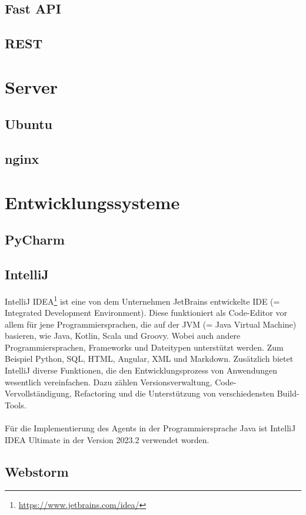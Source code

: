 \documentclass{report}
\begin{document}
\subsection{Fast API}
\subsection{REST}

\section{Server}
\subsection{Ubuntu}
\subsection{nginx}

\section{Entwicklungssysteme}
\subsection{PyCharm}
\subsection{IntelliJ }
IntelliJ IDEA\footnote{\url{https://www.jetbrains.com/idea/}} ist eine von dem Unternehmen JetBrains entwickelte IDE (= Integrated Development Environment). Diese funktioniert als Code-Editor vor allem für jene Programmiersprachen, die auf der JVM (= Java Virtual Machine) basieren, wie Java, Kotlin, Scala und Groovy. Wobei auch andere Programmiersprachen, Frameworks und Dateitypen unterstützt werden. Zum Beispiel Python, SQL, HTML, Angular, XML und Markdown. Zusätzlich bietet IntelliJ diverse Funktionen, die den Entwicklungsprozess von Anwendungen wesentlich vereinfachen. Dazu zählen Versionsverwaltung, Code-Vervollständigung, Refactoring und die Unterstützung von verschiedensten Build-Tools.\\\\
Für die Implementierung des Agents in der Programmiersprache Java ist IntelliJ IDEA Ultimate in der Version 2023.2 verwendet worden.
\subsection{Webstorm}
\end{document}
